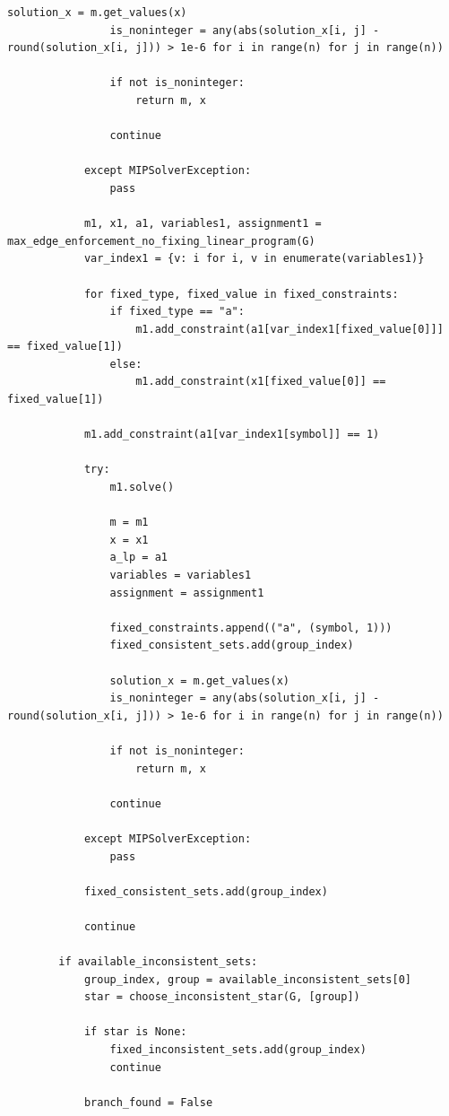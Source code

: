 \begin{lstlisting}[style=python, caption={Max Edge Enforcment Linear Program.}, label={lst::max_edge_enforcement_linear_program}]
                solution_x = m.get_values(x)
                is_noninteger = any(abs(solution_x[i, j] - round(solution_x[i, j])) > 1e-6 for i in range(n) for j in range(n))

                if not is_noninteger:
                    return m, x

                continue

            except MIPSolverException:
                pass

            m1, x1, a1, variables1, assignment1 = max_edge_enforcement_no_fixing_linear_program(G)
            var_index1 = {v: i for i, v in enumerate(variables1)}

            for fixed_type, fixed_value in fixed_constraints:
                if fixed_type == "a":
                    m1.add_constraint(a1[var_index1[fixed_value[0]]] == fixed_value[1])
                else:
                    m1.add_constraint(x1[fixed_value[0]] == fixed_value[1])

            m1.add_constraint(a1[var_index1[symbol]] == 1)

            try:
                m1.solve()

                m = m1
                x = x1
                a_lp = a1
                variables = variables1
                assignment = assignment1

                fixed_constraints.append(("a", (symbol, 1)))
                fixed_consistent_sets.add(group_index)

                solution_x = m.get_values(x)
                is_noninteger = any(abs(solution_x[i, j] - round(solution_x[i, j])) > 1e-6 for i in range(n) for j in range(n))

                if not is_noninteger:
                    return m, x

                continue

            except MIPSolverException:
                pass

            fixed_consistent_sets.add(group_index)

            continue

        if available_inconsistent_sets:
            group_index, group = available_inconsistent_sets[0]
            star = choose_inconsistent_star(G, [group])

            if star is None:
                fixed_inconsistent_sets.add(group_index)
                continue

            branch_found = False


\end{lstlisting}
